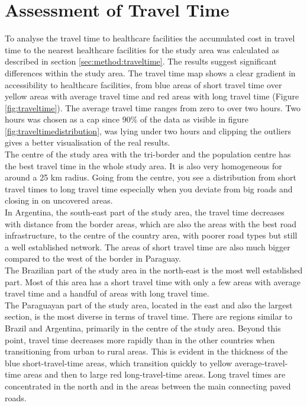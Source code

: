 \documentclass[11pt, a4paper]{report}
\begin{document}
\section{Assessment of Travel Time}
To analyse the travel time to healthcare facilities the accumulated cost in travel time to the nearest healthcare facilities  for the study area was calculated as described in section \ref{sec:method:traveltime}. The results suggest significant differences within the study area. The travel time map shows a clear gradient in accessibility to healthcare facilities, from blue areas of short travel time over yellow areas with average travel time and red areas with long travel time (Figure \ref{fig:traveltime}). The average travel time ranges from zero to over two hours. Two hours was chosen as a cap since $90\%$ of the data as visible in figure \ref{fig:traveltimedistribution}, was lying under two hours and clipping the outliers gives a better visualisation of the real results.\\
%
The centre of the study area with the tri-border and the population centre has the best travel time in the whole study area. It is also very homogeneous for around a 25 km radius. Going from the centre, you see a distribution from short travel times to long travel time especially when you deviate from big roads and closing in on uncovered areas.\\
%
In Argentina, the south-east part of the study area, the travel time decreases with distance from the border areas, which are also the areas with the best road infrastructure, to the centre of the country area, with poorer road types but still a well established network. The areas of short travel time are also much bigger compared to the west of the border in Paraguay.\\
%
The Brazilian part of the study area in the north-east is the most well established part. Most of this area has a short travel time with only a few areas with average travel time and a handful of areas with long travel time. \\
%
The Paraguayan part of the study area, located in the east and also the largest section, is the most diverse in terms of travel time. There are regions similar to Brazil and Argentina, primarily in the centre of the study area. Beyond this point, travel time decreases more rapidly than in the other countries when transitioning from urban to rural areas. This is evident in the thickness of the blue short-travel-time areas, which transition quickly to yellow average-travel-time areas and then to large red long-travel-time areas. Long travel times are concentrated in the north and in the areas between the main connecting paved roads.
\end{document}
